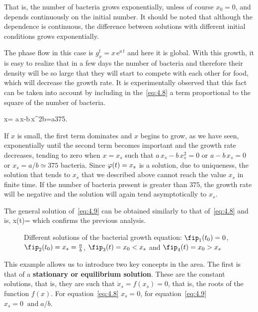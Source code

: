 That is, the number of bacteria grows exponentially, unless of course $x_0=0$, and depends continuously on the initial number. It should be noted that although the dependence is continuous, the difference between solutions with different initial conditions grows exponentially.

The phase flow in this case is $g^t_x=x\,\mbox{e}^{a\,t}$ and here it is global. With this growth, it is easy to realize that in a few days the number of bacteria and therefore their density will be so large that they will start to compete with each other for food, which will decrease the growth rate. It is experimentally observed that this fact can be taken into account by including in the~\ref{eq:4.8} a term proportional to the square of the number of bacteria.

\beq
\dot x= a\,x-b\,x^2\;\;\;\;\;\;\;\;\;b=\frac a{375}.
\label{eq:4.9}
\eeq

If $x$ is small, the first term dominates and $x$ begins to grow, as we have seen, exponentially until the second term becomes important and the growth rate decreases, tending to zero when $x=x_s$ such that $a\,x_s-b\,x_s^2=0$ or $a-b\,x_s=0$ or $x_s=a/b\simeq 375$ bacteria. Since $\mbox{$\varphi (t)$}=x_s$ is a solution, due to uniqueness, the solution that tends to $x_s$ that we described above cannot reach the value $x_s$ in finite time. If the number of bacteria present is greater than $375$, the growth rate will be negative and the solution will again tend asymptotically to $x_s$.

The general solution of~\ref{eq:4.9} can be obtained similarly to that of~\ref{eq:4.8} and is,
\beq
x(t)=
\eeq 
\noi which confirms the previous analysis.

\espa


\begin{figure}[htbp]
  \begin{center}
    \caption[Different solutions of the bacterial growth equation]{Different solutions of the bacterial growth equation:
$\fip_1(t_0)=0$, $\fip_2(t_0)=x_s=\frac ab$, $\fip_3(t)=x_0<x_s$ and
$\fip_4(t)=x_0>x_s$}
    \label{fig:4_3}
  \end{center}
\end{figure}

This example allows us to introduce two key concepts in the area.
The first is that of a {\bf stationary or equilibrium solution}. These are the constant solutions, that is, they are such that
$\dot x_s=f(x_s)=0$, that is, the roots of the function $f(x)$.
For equation~\ref{eq:4.8} $x_s=0$, for equation~\ref{eq:4.9}
$x_s=0\;\;\mbox{and}\;a/b$. 

